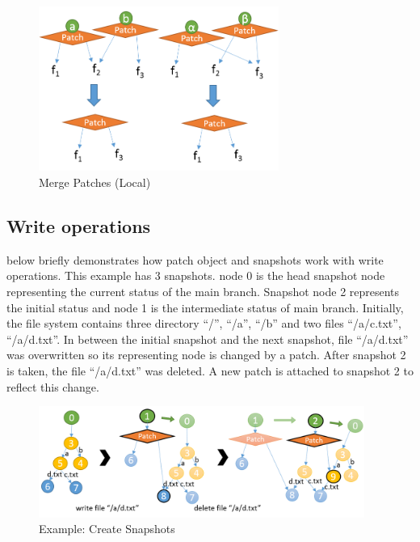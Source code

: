 \begin{figure}[hbtp]
\centering
\includegraphics[width=0.7\textwidth]{Chapter-4/figs/fig19.png}
\caption{Merge Patches (Local)}
\label{fig:merge}
\end{figure}

\subsection{Write operations}

	 below briefly demonstrates how patch object and snapshots work with write operations. This example has 3 snapshots. node 0 is the head snapshot node representing the current status of the main branch. Snapshot node 2 represents the initial status and node 1 is the intermediate status of main branch. Initially, the file system contains three directory ``/'', ``/a'', ``/b'' and two files ``/a/c.txt'', ``/a/d.txt''. In between the initial snapshot and the next snapshot, file ``/a/d.txt'' was overwritten so its representing node is changed by a patch. After snapshot 2 is taken, the file ``/a/d.txt'' was deleted. A new patch is attached to snapshot 2 to reflect this change.

\begin{figure}[hbtp]
\centering
\includegraphics[width=0.95\textwidth]{Chapter-4/figs/fig26.png}
\caption{Example: Create Snapshots}
\label{fig:create_snapshots}
\end{figure}

